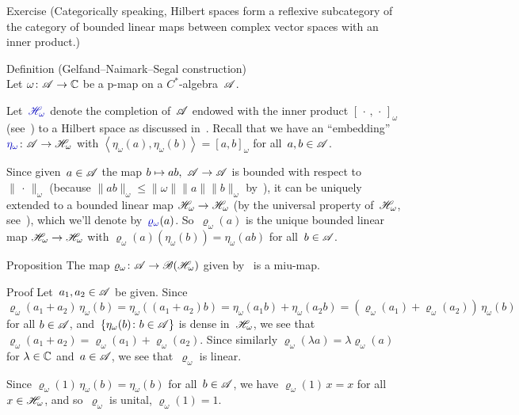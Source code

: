 \documentclass[a]{subfiles}
\begin{document}
\begin{parsec}
\begin{point}{Exercise}
(Categorically speaking,
Hilbert spaces
form a reflexive subcategory of
the category of bounded linear maps between
complex vector spaces with an inner product.)
\end{point}
\begin{point}[gns]{Definition (Gelfand--Naimark--Segal construction)}%
%
	\\
Let $\omega\colon \mathscr{A}\to\mathbb{C}$ be a p-map on a $C^*$-algebra~$\mathscr{A}$.

Let~$\Define{\scrH_\omega}$%
	denote the completion
of~$\mathscr{A}$ endowed with the inner product $[\,\cdot\,,\,\cdot\,]_\omega$
(see~)
to a Hilbert space as discussed in~.
Recall that we have an ``embedding''
$\Define{\eta_\omega}\colon \scrA\to\scrH_\omega$%
with $\left<\eta_\omega(a),\eta_\omega(b)\right>
= [a,b]_\omega$ for all~$a,b\in \mathscr{A}$.

Since given~$a\in \mathscr{A}$
the map $b\mapsto ab,\ \mathscr{A}\to\mathscr{A}$ is
bounded with respect to~$\|\,\cdot\,\|_\omega$
(because $\|ab\|_\omega\leq \|\omega\|\|a\|\|b\|_\omega$
by~),
it can be uniquely extended to a bounded linear map
$\mathscr{H}_\omega\to\mathscr{H}_\omega$
(by the universal property of~$\mathscr{H}_\omega$, 
see~),
which we'll denote by~$\Define{\varrho_\omega}(a)$.%
So~$\varrho_\omega(a)$ is the unique
bounded linear map $\mathscr{H}_\omega\to\mathscr{H}_\omega$
with $\varrho_\omega(a)(\eta_\omega(b)) = \eta_\omega(ab)$
for all~$b\in\mathscr{A}$.
\end{point}
\begin{point}{Proposition}%
The map $\varrho_\omega\colon \mathscr{A}\to\mathscr{B}(\mathscr{H}_\omega)$
given by~ is a miu-map.
\begin{point}{Proof}%
Let~$a_1,a_2\in\mathscr{A}$ be given.
Since $\varrho_\omega(a_1+a_2)\,\eta_\omega(b)
= \eta_\omega((a_1+a_2)b)
= \eta_\omega(a_1b)+\eta_\omega(a_2b)
= (\varrho_\omega(a_1) + \varrho_\omega(a_2))\,\eta_\omega(b)$
for all $b\in\mathscr{A}$,
and~$\{\eta_\omega(b)\colon b\in\mathscr{A}\}$
is dense in~$\mathscr{H}_\omega$,
we see that $\varrho_\omega(a_1+a_2)
=\varrho_\omega(a_1)+\varrho_\omega(a_2)$.
Since similarly $\varrho_\omega(\lambda a)
= \lambda\varrho_\omega(a)$
for $\lambda\in\mathbb{C}$ and~$a\in\mathscr{A}$,
we see that~$\varrho_\omega$ is linear.

Since $\varrho_\omega(1)\,\eta_\omega(b)
= \eta_\omega(b)$ for all~$b\in\mathscr{A}$,
we have $\varrho_\omega(1)\,x=x$
for all~$x\in\mathscr{H}_\omega$,
and so~$\varrho_\omega$ is unital,
$\varrho_\omega(1)=1$.


\end{point}
\end{point}
\end{parsec}
\end{document}
